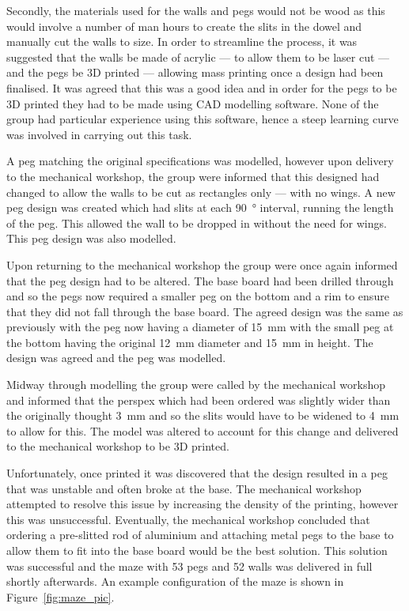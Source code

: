 Secondly, the materials used for the walls and pegs would not be wood as this
would involve a number of man hours to create the slits in the dowel and
manually cut the walls to size. In order to streamline the process, it was
suggested that the walls be made of acrylic --- to allow
them to be laser cut --- and the pegs be 3D printed --- allowing mass printing
once a design had been finalised. It was agreed that this was a good idea and
in order for the pegs to be 3D printed they had to be made using CAD modelling
software. None of the group had particular experience using this software, hence
a steep learning curve was involved in carrying out this task.

A peg matching the original specifications was modelled, however upon delivery
to the mechanical workshop, the group were informed that this designed had
changed to allow the walls to be cut as rectangles only --- with no wings. A new
peg design was created which had slits at each \SI{90}{\degree} interval,
running the length of the peg. This allowed the wall to be dropped in without
the need for wings. This peg design was also modelled.

Upon returning to the mechanical workshop the group were once again informed
that the peg design had to be altered. The base board had been drilled through
and so the pegs now required a smaller peg on the bottom and a rim to ensure
that they did not fall through the base board. The agreed design was the same as
previously with the peg now having a diameter of \SI{15}{\mm} with the small peg
at the bottom having the original \SI{12}{\mm} diameter and \SI{15}{\mm} in
height. The design was agreed and the peg was modelled.

Midway through modelling the group were called by the mechanical workshop and
informed that the perspex which had been ordered was slightly wider than the
originally thought \SI{3}{\mm} and so the slits would have to be widened to
\SI{4}{\mm} to allow for this. The model was altered to account for this change and delivered to the mechanical workshop to be 3D printed.

Unfortunately, once printed it was discovered that the design resulted in a peg
that was unstable and often broke at the base. The mechanical workshop
attempted to resolve this issue by increasing the density of the printing,
however this was unsuccessful. Eventually, the mechanical workshop concluded
that ordering a pre-slitted rod of aluminium and attaching metal pegs to the
base to allow them to fit into the base board would be the best solution. This
solution was successful and the maze with 53 pegs and 52 walls was
delivered in full shortly afterwards. An example configuration of the maze is shown in Figure~\ref{fig:maze_pic}.

